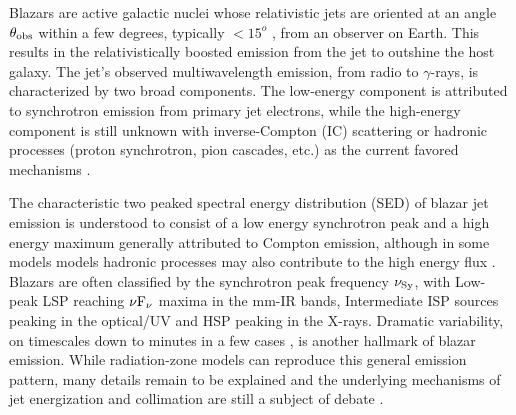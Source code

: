 Blazars are active galactic nuclei whose relativistic jets are oriented at an angle $\theta_{\rm obs}$ within a few degrees, typically $<15^o$ \citep{liodakis_multiwavelength_2018}, from an observer on Earth. This results in the relativistically boosted emission from the jet to outshine the host galaxy. The jet's observed multiwavelength emission, from radio to $\gamma$-rays, is characterized by two broad components. The low-energy component is attributed to synchrotron emission from primary jet electrons, while the high-energy component is still unknown with inverse-Compton (IC) scattering or hadronic processes (proton synchrotron, pion cascades, etc.) as the current favored mechanisms \citep{blandford_relativistic_2019}. 

The characteristic two peaked spectral energy distribution (SED) of blazar jet emission is understood
to consist of a low energy synchrotron peak and a high energy maximum generally attributed to
Compton emission, although in some models models hadronic processes may also contribute to the high
energy flux \citep{boettcher_modeling_2012}. Blazars are often classified by the synchrotron peak frequency
$\rm \nu_{Sy}$, with Low-peak LSP reaching $\rm \nu F_\nu$ maxima in the mm-IR bands, Intermediate ISP sources
peaking in the optical/UV and HSP peaking in the X-rays.
Dramatic variability, on timescales down to minutes in a few cases
\citep{ackermann_minute-timescale_2016}, is another hallmark of blazar emission. While radiation-zone models can reproduce
this general emission pattern, many details remain to be explained and the underlying mechanisms of
jet energization and collimation are still a subject of debate \citep{blandford_relativistic_2018}.


